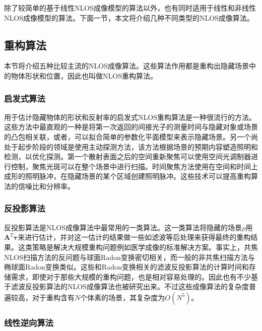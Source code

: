\documentclass[master]{shtthesis}             %
\begin{document}
除了较简单的基于线性NLOS成像模型的算法以外，也有同时适用于线性和非线性NLOS成像模型的算法。下面一节，本文将介绍几种不同类型的NLOS成像算法。

\subsection{重构算法}

本节将介绍五种比较主流的NLOS成像算法。这些算法作用都是重构出隐藏场景中的物体形状和位置，因此也叫做NLOS重构算法。

\subsubsection{启发式算法}

用于估计隐藏物体的形状和反射率的启发式NLOS重构算法是一种很流行的方法。这些方法中最直观的一种是将第一次返回的间接光子的测量时间与隐藏对象或场景的凸包相关联\citep{Tsai2017}，或者，可以拟合简单的参数化平面模型来表示隐藏场景\citep{Pediredla2017}。另一个尚处于起步阶段的领域是使用主动探测方法，该方法根据场景的预期内容塑造照明和检测，以优化探测。第一个散射表面之后的空间重新聚焦可以使用空间光调制器进行控制，聚焦光斑可以在整个场景中进行扫描\citep{starshynov2019coherent}。时间聚焦方法使用在空间和时间上成形的照明脉冲，在隐藏场景的某个区域创建照明脉冲\citep{pediredla2019snlos}。这些技术可以提高重构算法的信噪比和分辨率。

\subsubsection{反投影算法}

反投影算法是NLOS成像算法中最常用的一类算法。这一类算法将隐藏的场景$\rho$用$\mathbf{A}^T\mathbf{\tau}$来进行估计，并对这一估计的结果做一些如滤波等后处理来获得最终的重构结果。这类策略是解决大规模重构问题例如医学成像的标准解决方案。事实上，共焦NLOS扫描方法的反问题与球面Radon变换密切相关\citep{tasinkevych2014circular}，而一般的非共焦扫描方法与椭球面Radon变换类似\citep{moon2014determination}。这些和Radon变换相关的滤波反投影算法的计算时间和存储需求，即使对于那些大规模的重构问题，也是相对容易处理的。因此也有不少基于滤波反投影算法的NLOS成像算法也被研究出来\citep{Velten2012,gupta2012reconstruction,buttafava2014time,Laurenzis2014,Arellano2017}。不过这些成像算法的复杂度普遍较高，对于重构含有$N$个体素的场景，其复杂度为$O(N^5)$。

\subsubsection{线性逆向算法}
\end{document}
